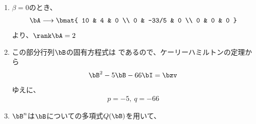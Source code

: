 \begin{ans*}
\begin{enumerate}[label=(\arabic*), ref=(\arabic*), itemsep=0pt]
    また、$\beta\neq 0$のとき、
    \begin{align}
      \left[\begin{array}[]{ccc|ccc}
        10 & 4 & 0 & 1 & 0 & 0 \\
        4 & -5 & 0 & 0 & 1 & 0 \\
        0 & 0 & \beta & 0 & 0 & 1
      \end{array}\right]
      &\longrightarrow
      \left[\begin{array}[]{ccc|ccc}
        10 & 4 & 0 & 1 & 0 & 0 \\
        0 & 1 & 0 & 4/66 & -10/66 & 0 \\
        0 & 0 & 1 & 0 & 0 & 1/\beta
      \end{array}\right]\\
      &\longrightarrow
      \left[\begin{array}[]{ccc|ccc}
        &&& 5/66 & 4/66 &  0 \\
        &\bE&& 4/66 & -10/66 & 0 \\
        &&& 0 & 0 & 1/\beta
      \end{array}\right]
    \end{align}
    ゆえに、$\bA$の逆行列は
    \begin{gather}
      \bA^{-1} = \bmat{
        5/66 & 2/33 &  0 \\
        2/33 & -5/33 & 0 \\
        0 & 0 & 1/\beta
      }
    \end{gather}
    \item $\beta = 0$のとき、
    \begin{align}
      \bA
      \longrightarrow\bmat{
        10 & 4 & 0 \\
        0 & -33/5 & 0 \\
        0 & 0 & 0
      }
    \end{align}
    より、$\rank\bA = 2$
    \item この部分行列$\bB$の固有方程式は
    であるので、ケーリーハミルトンの定理から %
    \begin{gather}
      \bB^{2} -5\bB - 66\bI = \bzv
    \end{gather}
    ゆえに、
    \begin{gather}
      p = -5 ,~ q = -66
    \end{gather}
    \item $\bB^{n}$は$\bB$についての多項式$Q(\bB)$を用いて、
    \begin{gather}

\end{gather}
\end{enumerate}
\end{ans*}
